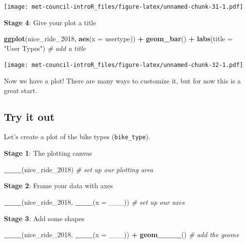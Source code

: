 \documentclass[]{book}
\newenvironment{Shaded}{\begin{snugshade}}{\end{snugshade}}
\newcommand{\KeywordTok}[1]{\textcolor[rgb]{0.13,0.29,0.53}{\textbf{#1}}}
\newcommand{\DataTypeTok}[1]{\textcolor[rgb]{0.13,0.29,0.53}{#1}}
\newcommand{\DecValTok}[1]{\textcolor[rgb]{0.00,0.00,0.81}{#1}}
\newcommand{\StringTok}[1]{\textcolor[rgb]{0.31,0.60,0.02}{#1}}
\newcommand{\CommentTok}[1]{\textcolor[rgb]{0.56,0.35,0.01}{\textit{#1}}}
\newcommand{\OperatorTok}[1]{\textcolor[rgb]{0.81,0.36,0.00}{\textbf{#1}}}
\newcommand{\NormalTok}[1]{#1}
\begin{document}
\texttt{[image: met-council-introR\_files/figure-latex/unnamed-chunk-31-1.pdf]}

\textbf{Stage 4}: Give your plot a title

\begin{Shaded}
\begin{Highlighting}[]
\KeywordTok{ggplot}\NormalTok{(nice_ride_}\DecValTok{2018}\NormalTok{, }\KeywordTok{aes}\NormalTok{(}\DataTypeTok{x =}\NormalTok{ usertype)) }\OperatorTok{+}\StringTok{ }
\StringTok{  }\KeywordTok{geom_bar}\NormalTok{() }\OperatorTok{+}
\StringTok{  }\KeywordTok{labs}\NormalTok{(}\DataTypeTok{title =} \StringTok{"User Types"}\NormalTok{) }\CommentTok{# add a title}
\end{Highlighting}
\end{Shaded}

\texttt{[image: met-council-introR\_files/figure-latex/unnamed-chunk-32-1.pdf]}

Now we have a plot! There are many ways to customize it, but for now
this is a great start.

\subsection{Try it out}\label{try-it-out-2}

Let's create a plot of the bike types (\texttt{bike\_type}).

\textbf{Stage 1}: The plotting canvas

\begin{Shaded}
\begin{Highlighting}[]
\KeywordTok{___}\NormalTok{(nice_ride_}\DecValTok{2018}\NormalTok{) }\CommentTok{# set up our plotting area }
\end{Highlighting}
\end{Shaded}

\textbf{Stage 2}: Frame your data with axes

\begin{Shaded}
\begin{Highlighting}[]
\KeywordTok{___}\NormalTok{(nice_ride_}\DecValTok{2018}\NormalTok{, }\KeywordTok{___}\NormalTok{(}\DataTypeTok{x =}\NormalTok{ ___)) }\CommentTok{# set up our axes}
\end{Highlighting}
\end{Shaded}

\textbf{Stage 3}: Add some shapes

\begin{Shaded}
\begin{Highlighting}[]
\KeywordTok{___}\NormalTok{(nice_ride_}\DecValTok{2018}\NormalTok{, }\KeywordTok{___}\NormalTok{(}\DataTypeTok{x =}\NormalTok{ ___)) }\OperatorTok{+}\StringTok{ }
\StringTok{  }\KeywordTok{geom____}\NormalTok{() }\CommentTok{# add the geoms}
\end{Highlighting}
\end{Shaded}
\end{document}
